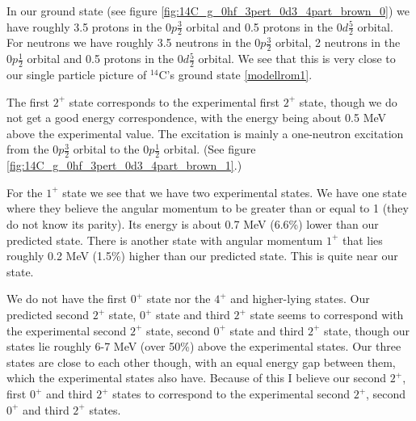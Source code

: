 In our ground state (see figure \ref{fig:14C_g_0hf_3pert_0d3_4part_brown_0}) we
have roughly 3.5 protons in the $0p\frac32$ orbital and 0.5 protons in the
$0d\frac52$ orbital. For neutrons we have roughly 3.5 neutrons in the $0p\frac32$
orbital, 2 neutrons in the $0p\frac12$ orbital and 0.5 protons in the $0d\frac52$
orbital. We see that this is very close to our single particle picture of
$^{14}$C's ground state \ref{modellrom1}. 


The first $2^+$ state corresponds to the experimental first $2^+$ state, though
we do not get a good energy correspondence, with the energy being about 0.5 MeV
above the experimental value. The excitation is mainly a one-neutron
excitation from the $0p\frac32$ orbital to the $0p\frac12$ orbital. (See figure
\ref{fig:14C_g_0hf_3pert_0d3_4part_brown_1}.)

For the $1^+$ state we see that we have two experimental states. 
We have one state where they believe the angular momentum to be
greater than or equal to 1 (they do not know its parity). Its energy is about
0.7 MeV (6.6\%) lower than our predicted state. There is another state with
angular momentum $1^+$ that lies roughly 0.2 MeV (1.5\%) higher than our
predicted state. This is quite near our state.


We do not have the first $0^+$ state nor the $4^+$ and higher-lying states. Our
predicted second $2^+$ state, $0^+$ state and third $2^+$ state seems to
correspond with the experimental second $2^+$ state, second $0^+$ state and
third $2^+$ state, though our states lie roughly 6-7 MeV (over 50\%) above the
experimental states. Our three states are close to each other though, with an
equal energy gap between them, which the experimental states also have.
Because of this I believe our second $2^+$, first $0^+$ and third $2^+$ states
to correspond to the experimental second $2^+$, second $0^+$ and third $2^+$
states. 

